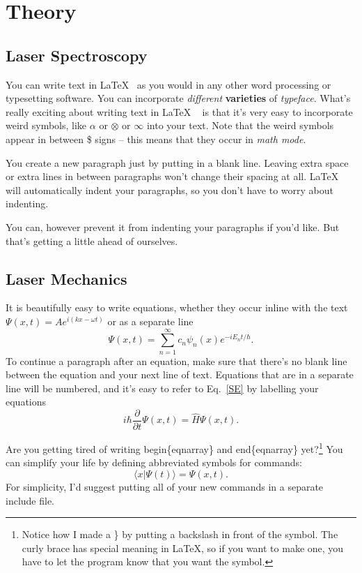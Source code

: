 \documentclass[../main]{subfiles}
\begin{document}
\chapter{Theory}
\section*{Laser Spectroscopy}
You can write text in \LaTeX ~ as you would in any other word processing or typesetting software.  You can incorporate \textit{different} \textbf{varieties} of \textsl{typeface}.  What's really exciting about writing text in \LaTeX 
~ is that it's very easy to incorporate weird symbols, like $\alpha$ or $\otimes$ or $\infty$ into your text.  Note that the weird symbols appear in between \$ signs -- this means that they occur in \textit{math mode}.

You create a new paragraph just by putting in a blank line.  Leaving extra space or extra lines in between paragraphs won't change their spacing at all.  \LaTeX ~ will automatically indent your paragraphs, so you don't have to worry about indenting.

\noindent You can, however prevent it from indenting your paragraphs if you'd like.  But that's getting a little ahead of ourselves.  







\section*{Laser Mechanics}

It is beautifully easy to write equations, whether they occur inline with the text  $\Psi(x,t) = A e^{i(kx -\omega t)}$ or as a separate line
\begin{equation}
\Psi(x,t) =\sum_{n=1}^\infty c_n \psi_n(x) e^{-i E_n t/\hbar}.
\end{equation}
To continue a paragraph after an equation, make sure that there's no blank line between the equation and your next line of text.
Equations that are in a separate line will be numbered, and it's easy to refer to Eq.~\ref{SE} by labelling your equations  
\begin{equation}
i\hbar\frac{\partial}{\partial t}\Psi(x,t) = \hat{H} \Psi(x,t). 
\label{SE}
\end{equation}

Are you getting tired of writing begin\{eqnarray\} and end\{eqnarray\} yet?\footnote{Notice how I made a \} by putting a backslash in front of the symbol.  The curly brace has special meaning in \LaTeX, so if you want to make one, you have to let the program know that you want the symbol.}  You can simplify your life by defining abbreviated symbols for commands:
\newcommand{\beq}{\begin{equation}}
\newcommand{\eeq}{\end{equation}}
\beq
\langle x |\Psi(t)\rangle = \Psi(x,t).
\eeq
For simplicity, I'd suggest putting all of your new commands in a separate include file.
\end{document}

